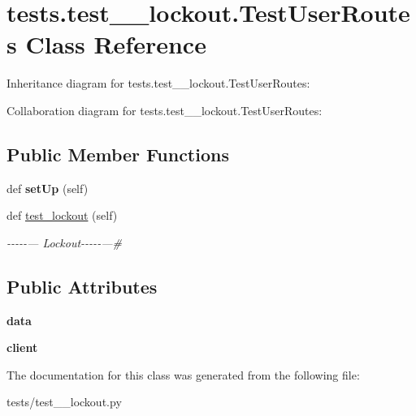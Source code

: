 \hypertarget{classtests_1_1test__5__lockout_1_1_test_user_routes}{}\section{tests.\+test\+\_\+\_\+lockout.\+Test\+User\+Routes Class Reference}
\label{classtests_1_1test__5__lockout_1_1_test_user_routes}


Inheritance diagram for tests.\+test\+\_\+\_\+lockout.\+Test\+User\+Routes\+:


Collaboration diagram for tests.\+test\+\_\+\_\+lockout.\+Test\+User\+Routes\+:
\subsection*{Public Member Functions}
\begin{DoxyCompactItemize}
\item 
\mbox{\label{classtests_1_1test__5__lockout_1_1_test_user_routes_ac18f95845c9e673845f539fc9ff195a5}} 
def {\bfseries set\+Up} (self)
\item 
\mbox{\label{classtests_1_1test__5__lockout_1_1_test_user_routes_a521a36455254123faf4a39c0409b4047}} 
def \hyperlink{classtests_1_1test__5__lockout_1_1_test_user_routes_a521a36455254123faf4a39c0409b4047}{test\+\_\+lockout} (self)
\begin{DoxyCompactList}\small\item\em -\/-\/-\/-\/-\/--- Lockout-\/-\/-\/-\/-\/---\# \end{DoxyCompactList}\end{DoxyCompactItemize}
\subsection*{Public Attributes}
\begin{DoxyCompactItemize}
\item 
\mbox{\label{classtests_1_1test__5__lockout_1_1_test_user_routes_af6c3dc409b15633601a67a8305c0a17d}} 
{\bfseries data}
\item 
\mbox{\label{classtests_1_1test__5__lockout_1_1_test_user_routes_aabc485010a3b51f5329bbb5fc5f94608}} 
{\bfseries client}
\end{DoxyCompactItemize}


The documentation for this class was generated from the following file\+:\begin{DoxyCompactItemize}
\item 
tests/test\+\_\+\_\+lockout.\+py\end{DoxyCompactItemize}
